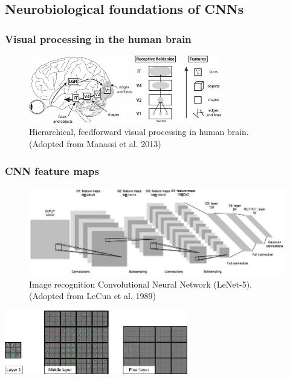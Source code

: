\documentclass[a4paper,9pt]{beamer}
\theoremstyle{mytheoremstyle}
\begin{document}
\begin{frame}
\begin{columns}
\end{columns}
\end{frame}

\subsection{Neurobiological foundations of CNNs}

\begin{frame}
\frametitle{Visual processing in the human brain}
\begin{figure}
\begin{center}
  \includegraphics[width=0.75\textwidth]{res/human_vision.png}
\end{center}
	\caption{Hierarchical, feedforward visual processing in human brain. (Adopted from Manassi et al. 2013)}
\end{figure}
\end{frame}

\begin{frame}
\frametitle{CNN feature maps}
\begin{figure}
\begin{center}
  \includegraphics[width=\textwidth]{res/lenet.png}
\end{center}
	\caption{Image recognition Convolutional Neural Network (LeNet-5). (Adopted from LeCun et al. 1989)}
\end{figure}
\begin{center}
\includegraphics[width=0.6\textwidth]{res/filter_vis.png}
\end{center}
\end{frame}
\end{document}
